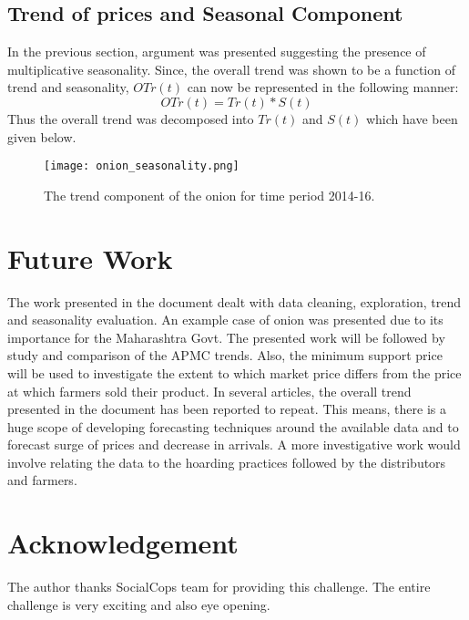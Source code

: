 \documentclass{article}
\begin{document}
\subsection{Trend of prices and Seasonal Component}
In the previous section, argument was presented suggesting the presence of multiplicative seasonality. Since, the overall trend was shown to be a function of trend and seasonality, $OTr(t)$ can now be represented in the following manner:
\begin{equation}
	OTr(t) = Tr(t)*S(t)
\end{equation}
Thus the overall trend was decomposed into $Tr(t)$ and $S(t)$ which have been given below.

\begin{figure}

	\texttt{[image: onion\_seasonality.png]}
	\caption{The trend component of the onion for time period 2014-16. }
	\label{fig:onionseasonal}
\end{figure}
\section{Future Work}
The work presented in the document dealt with data cleaning, exploration, trend and seasonality evaluation. An example case of onion was presented due to its importance for the Maharashtra Govt. The presented work will be followed by study and comparison of the APMC trends. Also, the minimum support price will be used to investigate the extent to which market price differs from the price at which farmers sold their product. In several articles, the overall trend presented in the document has been reported to repeat. This means, there is a huge scope of developing forecasting techniques around the available data and to forecast surge of prices and decrease in arrivals. A more investigative work would involve relating the data to the hoarding practices followed by the distributors and farmers. 
\section{Acknowledgement} 
The author thanks SocialCops team for providing this challenge. The entire challenge is very exciting and also eye opening. 
\end{document}
